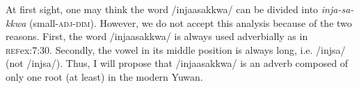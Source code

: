 At first sight, one may think the word /injaasakkwa/ can be divided into \textit{inja-sa-kkwa} (small-\textsc{adj}-\textsc{dim}). However, we do not accept this analysis because of the two reasons. First, the word /injaasakkwa/ is always used adverbially as in \textsc{ref}{ex:7:30}. Secondly, the vowel in its middle position is always long, i.e. /injsa/ (not /injsa/). Thus, I will propose that /injaasakkwa/ is an adverb composed of only one root (at least) in the modern Yuwan.
